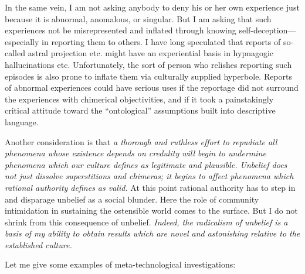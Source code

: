 In the same vein, I am not asking anybody to deny his or her own experience just 
because it is abnormal, anomalous, or singular. But I am asking that such experiences 
not be misrepresented and inflated through knowing self-deception---especially 
in reporting them to others. I have long speculated that reports of 
so-called astral projection etc. might have an experiential basis in hypnagogic 
hallucinations etc. Unfortunately, the sort of person who relishes reporting such 
episodes is also prone to inflate them via culturally supplied hyperbole. Reports of 
abnormal experiences could have serious uses if the reportage did not surround the 
experiences with chimerical objectivities, and if it took a painstakingly critical 
attitude toward the \enquote{ontological} assumptions built into descriptive language. 

Another consideration is that \textit{a thorough and ruthless effort to repudiate all 
phenomena whose existence depends on credulity will begin to undermine phenomena which 
our culture defines as legitimate and plausible. Unbelief does not just dissolve 
superstitions and chimeras; it begins to affect phenomena which rational authority defines as 
valid.} At this point rational authority has to step in and disparage unbelief as a 
social blunder. Here the role of community intimidation in sustaining the ostensible 
world comes to the surface. But I do not shrink from this consequence of 
unbelief. \textit{Indeed, the radicalism of unbelief is a basis of my ability to obtain results which 
are novel and astonishing relative to the established culture.}

\visbreak

Let me give some examples of meta-technological investigations: 

